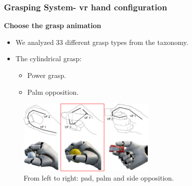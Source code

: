 \documentclass{beamer}
\theoremstyle{remark}
\theoremstyle{plain}
\begin{document}
\begin{frame}
\frametitle{Grasping System- vr hand configuration}

\textbf{Choose the grasp animation}

\begin{itemize}
	\item We analyzed 33 different grasp types from the taxonomy.
	\item The cylindrical grasp:
	\begin{itemize}
		\item Power grasp.
		\item Palm opposition.
	\end{itemize}
\end{itemize}

\begin{figure}
	\centering
	\includegraphics[width=0.6\textwidth]{images/grasp_taxonomy}
	\caption{From left to right: pad, palm and side opposition.}
\end{figure}
\end{frame}
\end{document}
